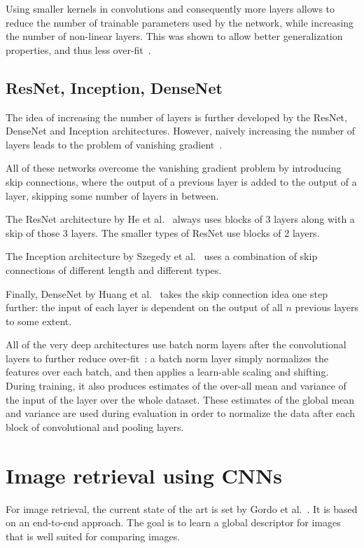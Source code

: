 Using smaller kernels in convolutions and consequently more layers
allows to reduce the number of trainable parameters used by the
network, while increasing the number of non-linear layers.
This was shown to allow better generalization properties, and thus less
over-fit~\cite{simonyan_very_2014}.

\subsection{ResNet, Inception, DenseNet}\label{sec:verydeepCNNs}
The idea of increasing the number of layers is further developed
by the ResNet, DenseNet and Inception architectures. However,
naively increasing the number of layers leads to the problem of
vanishing gradient~\cite{hinton_fast_2006}.

All of these networks overcome the vanishing gradient problem by
introducing skip connections, where the output of a previous layer
is added to the output of a layer, skipping some number of layers in
between.

The ResNet architecture by He et al.~\cite{he_deep_2016} always uses blocks
of 3 layers along with a skip of those 3 layers. The smaller types of
ResNet use blocks of 2 layers.

The Inception architecture by Szegedy et al.~\cite{szegedy_inception-v4_2016}
uses a combination of skip connections of different length and different
types.

Finally, DenseNet by Huang et al.~\cite{huang_densely_2017} takes the
skip connection idea one step further:
the input of each layer is dependent on the output of all $n$ previous layers
to some extent.

All of the very deep architectures use batch norm layers after the
convolutional layers to further reduce over-fit~\cite{ioffe_batch_2015}:
a batch norm layer simply normalizes the features over each
batch, and then applies a learn-able scaling and shifting. During training,
it also produces estimates of the over-all mean and variance of the input
of the layer over the whole dataset.
These estimates of the global mean and variance are used during evaluation
in order to normalize the data after each block of convolutional and
pooling layers.

\section{Image retrieval using CNNs}
For image retrieval, the current state of the art is set by
Gordo et al.~\cite{gordo_deep_2016}. It is based on an
end-to-end approach. The goal is to learn a global descriptor for images
that is well suited for comparing images.

